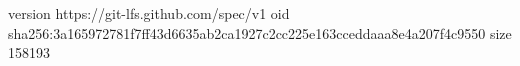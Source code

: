 version https://git-lfs.github.com/spec/v1
oid sha256:3a165972781f7ff43d6635ab2ca1927c2cc225e163cceddaaa8e4a207f4c9550
size 158193
